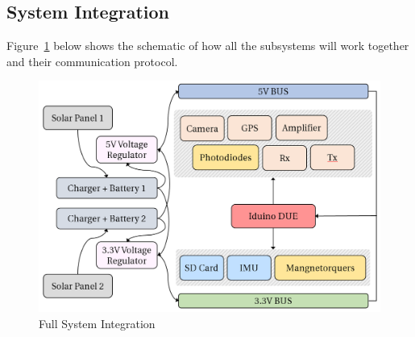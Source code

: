 \subsection{System Integration}
Figure~\ref{fig:integration} below shows the schematic of how all the subsystems will work together and their communication protocol.
\begin{figure}[H]
    \centering
    \includegraphics[width=0.75\linewidth]{./figures/integration}
    \caption{Full System Integration}
    \label{fig:integration}
\end{figure}
